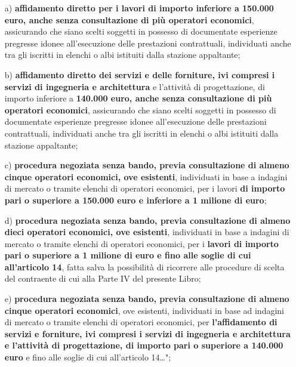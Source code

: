 \begin{enumerate}

\item[a)]  \textbf{affidamento diretto per i lavori di importo inferiore a 150.000
euro, anche senza consultazione di più operatori economici}, assicurando
che siano scelti soggetti in possesso di documentate esperienze pregresse
idonee all'esecuzione delle prestazioni contrattuali, individuati anche
tra gli iscritti in elenchi o albi istituiti dalla stazione appaltante;

\item[b)]  \textbf{affidamento diretto dei servizi e delle forniture, ivi compresi
i servizi di ingegneria e architettura} e l'attività di progettazione,
di importo inferiore a \textbf{140.000 euro, anche senza consultazione di più
operatori economici}, assicurando che siano scelti soggetti in possesso di
documentate esperienze pregresse idonee all'esecuzione delle prestazioni
contrattuali, individuati anche tra gli iscritti in elenchi o albi
istituiti dalla stazione appaltante;

\item[c)] \textbf{procedura negoziata senza bando, previa consultazione di almeno
cinque operatori economici, ove esistenti}, individuati in base a indagini
di mercato o tramite elenchi di operatori economici, per i lavori \textbf{di
importo pari o superiore a 150.000 euro e inferiore a 1 milione di euro};

\item[d)] \textbf{procedura negoziata senza bando, previa consultazione di almeno
dieci operatori economici, ove esistenti}, individuati in base a indagini
di mercato o tramite elenchi di operatori economici, per i \textbf{lavori di
importo pari o superiore a 1 milione di euro e fino alle soglie di cui
all'articolo 14}, fatta salva la possibilità di ricorrere alle procedure
di scelta del contraente di cui alla Parte IV del presente Libro;

\item[e)] \textbf{procedura negoziata senza bando, previa consultazione di almeno
cinque operatori economici}, ove esistenti, individuati in base ad indagini
di mercato o tramite elenchi di operatori economici, per \textbf{l'affidamento di
servizi e forniture, ivi compresi i servizi di ingegneria e architettura
e l'attività di progettazione, di importo pari o superiore a 140.000
euro} e fino alle soglie di cui all'articolo 14…";

\end{enumerate}

